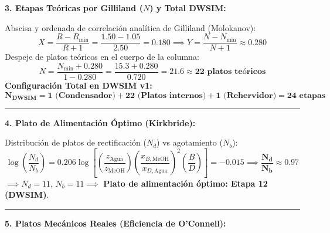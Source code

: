 \documentclass[10pt,landscape]{article}
\begin{document}
\hfill
\begin{minipage}[t]{0.488\textwidth}
  \begin{tcolorbox}[colback=white,colframe=navyblue,arc=1.5mm,boxrule=0.7pt,top=3pt,bottom=3pt,left=6pt,right=6pt,height=0.52\textheight]
    \setlength{\abovedisplayskip}{2pt}
    \setlength{\belowdisplayskip}{2pt}
    \textbf{\fontsize{8.5pt}{10pt}\selectfont \color{navyblue}3. Etapas Teóricas por Gilliland ($N$) y Total DWSIM:}\par\vspace{1.5pt}
    \scriptsize
    Abscisa y ordenada de correlación analítica de Gilliland (Molokanov):
    \begin{equation*}
      X = \frac{R - R_{\min}}{R + 1} = \frac{1.50 - 1.05}{2.50} = \mathbf{0.180} \implies Y = \frac{N - N_{\min}}{N + 1} \approx \mathbf{0.280}
    \end{equation*}
    Despeje de platos teóricos en el cuerpo de la columna:
    \begin{equation*}
      N = \frac{N_{\min} + 0.280}{1 - 0.280} = \frac{15.3 + 0.280}{0.720} = \mathbf{21.6 \approx 22\text{ platos teóricos}}
    \end{equation*}
    \textbf{Configuración Total en DWSIM v1:}
    \begin{equation*}
      \mathbf{N_{\text{DWSIM}} = 1\text{ (Condensador)} + 22\text{ (Platos internos)} + 1\text{ (Rehervidor)} = 24\text{ etapas}}
    \end{equation*}
    \vspace{1.5pt}
    \hrule
    \vspace{2.5pt}
    \textbf{\fontsize{8.5pt}{10pt}\selectfont \color{navyblue}4. Plato de Alimentación Óptimo (Kirkbride):}\par\vspace{1.5pt}
    Distribución de platos de rectificación ($N_d$) vs agotamiento ($N_b$):
    \begin{equation*}
      \log\left(\frac{N_d}{N_b}\right) = 0.206 \log\left[\left(\frac{z_{\text{Agua}}}{z_{\text{MeOH}}}\right)\left(\frac{x_{B,\text{MeOH}}}{x_{D,\text{Agua}}}\right)^2\left(\frac{B}{D}\right)\right] = -0.015 \implies \mathbf{\frac{N_d}{N_b} \approx 0.97}
    \end{equation*}
    $\implies N_d = 11$, $N_b = 11 \implies$ \textbf{Plato de alimentación óptimo: Etapa 12 (DWSIM)}.
    \vspace{1.5pt}
    \hrule
    \vspace{2.5pt}
    \textbf{\fontsize{8.5pt}{10pt}\selectfont \color{navyblue}5. Platos Mecánicos Reales (Eficiencia de O'Connell):}\par\vspace{1.5pt}

\end{tcolorbox}
\end{minipage}
\end{document}
